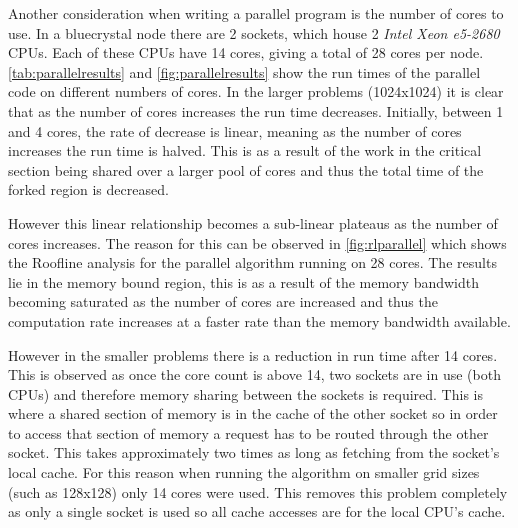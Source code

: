 \documentclass{article}
\begin{document}
\begin{multicols}{2}
Another consideration when writing a parallel program is the number of cores
to use. In a bluecrystal node there are 2 sockets, which house 2 \emph{Intel
Xeon e5-2680} CPUs. Each of these CPUs have 14 cores, giving a total of 28
cores per node. \autoref{tab:parallelresults} and \autoref{fig:parallelresults}
show the run times of the parallel code on different numbers of cores. In the
larger problems (1024x1024) it is clear that as the number of cores increases
the run time decreases. Initially, between 1 and 4 cores, the rate of decrease
is linear, meaning as the number of cores increases the run time is halved.
This is as a result of the work in the critical section being shared over a
larger pool of cores and thus the total time of the forked region is decreased.

However this linear relationship becomes a sub-linear plateaus as the number of
cores increases. The reason for this can be observed in
\autoref{fig:rlparallel} which shows the Roofline analysis for the parallel
algorithm running on 28 cores. The results lie in the memory bound region,
this is as a result of the memory bandwidth becoming saturated as the number of
cores are increased and thus the computation rate increases at a faster rate
than the memory bandwidth available. 

However in the smaller problems there is a reduction in run time after 14
cores. This is observed as once the core count is above 14, two sockets are in
use (both CPUs) and therefore memory sharing between the sockets is required.
This is where a shared section of memory is in the cache of the other
socket so in order to access that section of memory a request has to be routed
through the other socket. This takes approximately two times as long as
fetching from the socket's local cache. For this reason when running the
algorithm on smaller grid sizes (such as 128x128) only 14 cores were used. This
removes this problem completely as only a single socket is used so all cache
accesses are for the local CPU's cache.


\end{multicols}
\end{document}
